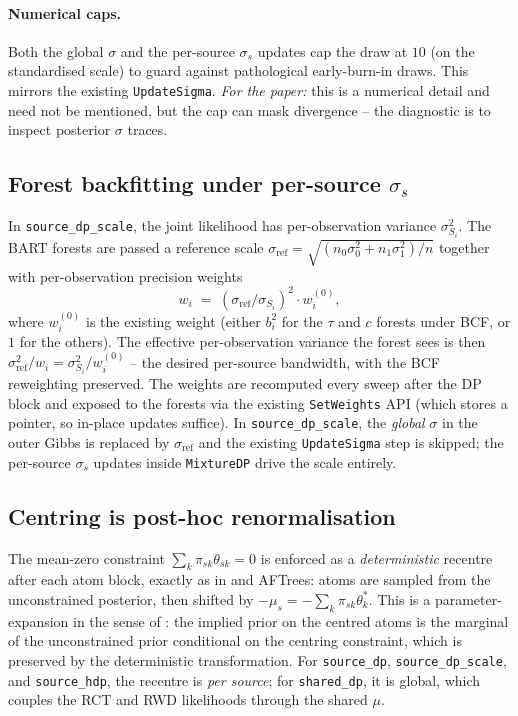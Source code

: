 \documentclass[11pt]{article}
\newcommand{\1}{\mathbf{1}}
\begin{document}
\paragraph{Numerical caps.} Both the global $\sigma$ and the per-source $\sigma_s$ updates cap the draw at $10$ (on the standardised scale) to guard against pathological early-burn-in draws. This mirrors the existing \texttt{UpdateSigma}. \emph{For the paper:} this is a numerical detail and need not be mentioned, but the cap can mask divergence -- the diagnostic is to inspect posterior $\sigma$ traces.

\subsection{Forest backfitting under per-source $\sigma_s$}\label{sec:impl-weights}

In \texttt{source\_dp\_scale}, the joint likelihood has per-observation variance $\sigma_{S_i}^2$. The BART forests are passed a reference scale $\sigma_\mathrm{ref} = \sqrt{(n_0 \sigma_0^2 + n_1 \sigma_1^2)/n}$ together with per-observation precision weights
\[
  w_i \;=\; (\sigma_\mathrm{ref} / \sigma_{S_i})^2 \cdot w_i^{(0)},
\]
where $w_i^{(0)}$ is the existing weight (either $b_i^2$ for the $\tau$ and $c$ forests under BCF, or $1$ for the others). The effective per-observation variance the forest sees is then $\sigma_\mathrm{ref}^2 / w_i = \sigma_{S_i}^2 / w_i^{(0)}$ -- the desired per-source bandwidth, with the BCF reweighting preserved. The weights are recomputed every sweep after the DP block and exposed to the forests via the existing \texttt{SetWeights} API (which stores a pointer, so in-place updates suffice). In \texttt{source\_dp\_scale}, the \emph{global} $\sigma$ in the outer Gibbs is replaced by $\sigma_\mathrm{ref}$ and the existing \texttt{UpdateSigma} step is skipped; the per-source $\sigma_s$ updates inside \texttt{MixtureDP} drive the scale entirely.

\subsection{Centring is post-hoc renormalisation}\label{sec:impl-centring}

The mean-zero constraint $\sum_k \pi_{sk} \theta_{sk} = 0$ is enforced as a \emph{deterministic} recentre after each atom block, exactly as in \citet{yang2010semiparametric} and AFTrees: atoms are sampled from the unconstrained posterior, then shifted by $-\mu_s = -\sum_k \pi_{sk}\theta_k^*$. This is a parameter-expansion in the sense of \citet{liu1999parameter}: the implied prior on the centred atoms is the marginal of the unconstrained prior conditional on the centring constraint, which is preserved by the deterministic transformation. For \texttt{source\_dp}, \texttt{source\_dp\_scale}, and \texttt{source\_hdp}, the recentre is \emph{per source}; for \texttt{shared\_dp}, it is global, which couples the RCT and RWD likelihoods through the shared $\mu$.
\end{document}
